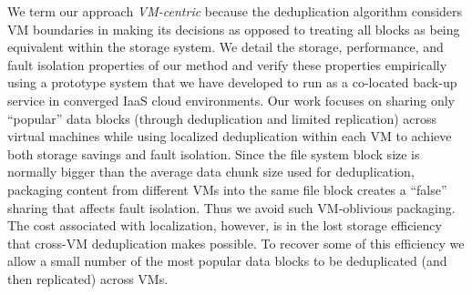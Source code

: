 We term our approach {\em VM-centric} because the deduplication
algorithm considers VM boundaries in making its decisions as opposed to
treating all blocks as being equivalent within the storage system.
We detail the storage, performance,
and fault isolation properties
of our method and verify these properties empirically using a prototype
system that we have developed to run as a co-located back-up service in
converged IaaS cloud environments.
Our work focuses on sharing only ``popular'' data blocks 
(through deduplication and limited replication)
across 
virtual machines while using localized deduplication within each VM
to achieve both storage savings and fault isolation.
Since
the file system block size is normally bigger than the average data chunk size
used for deduplication,  packaging
content from different VMs into the same file block  creates a ``false'' sharing that 
affects fault isolation. Thus we avoid such VM-oblivious packaging.
The cost associated with localization, however, is in 
the lost
storage efficiency that cross-VM deduplication makes possible.  To recover
some of this efficiency we allow a small number of the most popular data
blocks to be deduplicated (and then replicated) across VMs.  



